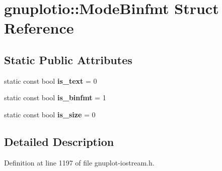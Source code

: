 \hypertarget{structgnuplotio_1_1_mode_binfmt}{}\section{gnuplotio\+:\+:Mode\+Binfmt Struct Reference}
\label{structgnuplotio_1_1_mode_binfmt}
\subsection*{Static Public Attributes}
\begin{DoxyCompactItemize}
\item 
static const bool {\bfseries is\+\_\+text} = 0\hypertarget{structgnuplotio_1_1_mode_binfmt_a7ab187fe922cac23b0d39ade81e5eb56}{}\label{structgnuplotio_1_1_mode_binfmt_a7ab187fe922cac23b0d39ade81e5eb56}

\item 
static const bool {\bfseries is\+\_\+binfmt} = 1\hypertarget{structgnuplotio_1_1_mode_binfmt_ab0d5d3718364cdea0347f93ec121d841}{}\label{structgnuplotio_1_1_mode_binfmt_ab0d5d3718364cdea0347f93ec121d841}

\item 
static const bool {\bfseries is\+\_\+size} = 0\hypertarget{structgnuplotio_1_1_mode_binfmt_a40a5a8ee815d6a5e9a3c30c8290a6967}{}\label{structgnuplotio_1_1_mode_binfmt_a40a5a8ee815d6a5e9a3c30c8290a6967}

\end{DoxyCompactItemize}


\subsection{Detailed Description}


Definition at line 1197 of file gnuplot-\/iostream.\+h.

